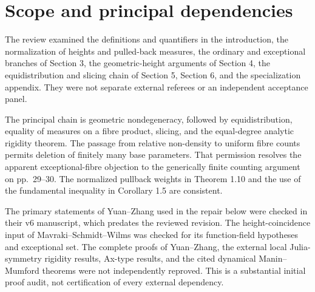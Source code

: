 \documentclass[10pt]{article}
\begin{document}
\section*{Scope and principal dependencies}
The review examined the definitions and quantifiers in the introduction, the normalization of heights and pulled-back measures, the ordinary and exceptional branches of Section 3, the geometric-height arguments of Section 4, the equidistribution and slicing chain of Section 5, Section 6, and the specialization appendix. They were not separate external referees or an independent acceptance panel.\par
The principal chain is geometric nondegeneracy, followed by equidistribution, equality of measures on a fibre product, slicing, and the equal-degree analytic rigidity theorem. The passage from relative non-density to uniform fibre counts permits deletion of finitely many base parameters. That permission resolves the apparent exceptional-fibre objection to the generically finite counting argument on pp. 29–30. The normalized pullback weights in Theorem 1.10 and the use of the fundamental inequality in Corollary 1.5 are consistent.\par
The primary statements of Yuan–Zhang used in the repair below were checked in their v6 manuscript, which predates the reviewed revision. The height-coincidence input of Mavraki–Schmidt–Wilms was checked for its function-field hypotheses and exceptional set. The complete proofs of Yuan–Zhang, the external local Julia-symmetry rigidity results, Ax-type results, and the cited dynamical Manin–Mumford theorems were not independently reproved. This is a substantial initial proof audit, not certification of every external dependency.\par
\end{document}
